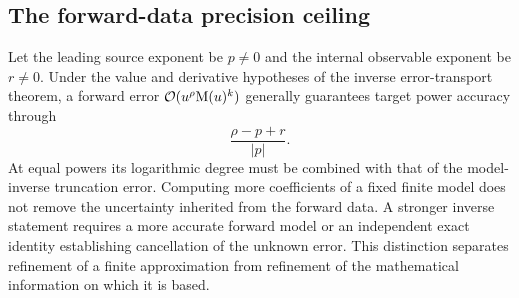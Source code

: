 \subsection{The forward-data precision ceiling}

Let the leading source exponent be $p\ne0$ and the internal observable
exponent be $r\ne0$. Under the value and derivative hypotheses of the inverse
error-transport theorem, a forward error
$\mathcal O(u^\rho\mathrm M(u)^k)$ generally guarantees target power accuracy through
\[
 \frac{\rho-p+r}{|p|}.
\]
At equal powers its logarithmic degree must be combined with that of the
model-inverse truncation error. Computing more coefficients of a fixed
finite model does not remove the uncertainty inherited from the forward
data. A stronger inverse statement requires a more accurate forward model
or an independent exact identity establishing cancellation of the unknown
error. This distinction separates refinement of a finite approximation
from refinement of the mathematical information on which it is based.
